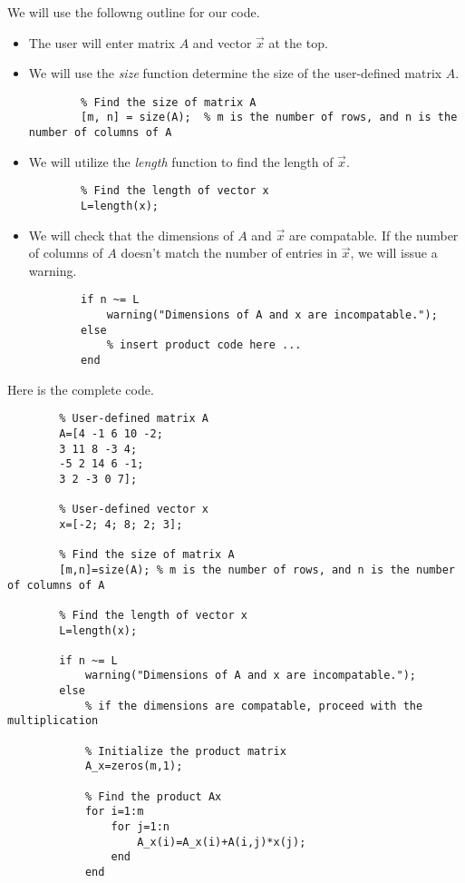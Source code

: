 \documentclass{ximera}
\begin{document}
\begin{example}
    \begin{explanation}
    We will use the followng outline for our code.
    \begin{itemize}
    \item The user will enter matrix $A$ and vector $\vec{x}$ at the top.    
    \item We will use the \emph{size} function determine the size of the user-defined matrix $A$.  
    \begin{verbatim}
        % Find the size of matrix A
        [m, n] = size(A);  % m is the number of rows, and n is the number of columns of A
    \end{verbatim}
    \item We will utilize the \emph{length} function to find the length of $\vec{x}$.
    \begin{verbatim}
        % Find the length of vector x
        L=length(x);
    \end{verbatim}
    \item We will check that the dimensions of $A$ and $\vec{x}$ are compatable.  If the number of columns of $A$ doesn't match the number of entries in $\vec{x}$, we will issue a warning. 
    \begin{verbatim}
        if n ~= L  
            warning("Dimensions of A and x are incompatable.");  
        else  
            % insert product code here ... 
        end    
    \end{verbatim}
\end{itemize}

    Here is the complete code.

    \begin{verbatim}
        % User-defined matrix A
        A=[4 -1 6 10 -2;
        3 11 8 -3 4;
        -5 2 14 6 -1;
        3 2 -3 0 7];

        % User-defined vector x
        x=[-2; 4; 8; 2; 3];

        % Find the size of matrix A
        [m,n]=size(A); % m is the number of rows, and n is the number of columns of A

        % Find the length of vector x
        L=length(x);

        if n ~= L
            warning("Dimensions of A and x are incompatable.");
        else
            % if the dimensions are compatable, proceed with the multiplication

            % Initialize the product matrix
            A_x=zeros(m,1);

            % Find the product Ax 
            for i=1:m
                for j=1:n
                    A_x(i)=A_x(i)+A(i,j)*x(j);
                end
            end


\end{verbatim}
\end{explanation}
\end{example}
\end{document}
